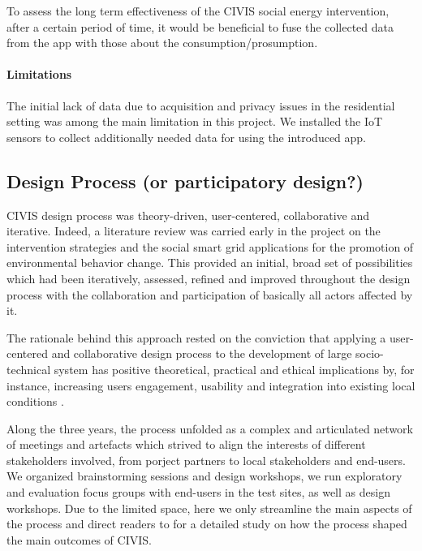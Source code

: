 To assess the long term effectiveness of the CIVIS social energy intervention,  after a certain period of time, it would be beneficial to fuse the collected data from the app with those about the consumption/prosumption. 

\paragraph{Limitations} The initial lack of data due to acquisition and privacy issues in the residential setting was among the main limitation in this project. We installed the IoT sensors to collect additionally needed data for using the introduced app. 

\subsection{Design Process (or participatory design?)}


CIVIS design process was theory-driven, user-centered, collaborative and iterative. Indeed, a
literature review was carried early in the project on the intervention strategies and the social smart
grid applications for the promotion of environmental behavior change. This provided an initial, broad set
of possibilities which had been iteratively, assessed, refined and improved throughout the design process with
the collaboration and participation of basically all actors affected by it.

The rationale behind this approach rested on the conviction that applying a user-centered and
collaborative design process to the development of large socio-technical system has positive
theoretical, practical and ethical implications \cite{Greenbaum1993,Boedker2004} by, for instance, increasing users engagement,
usability and integration into existing local conditions \cite{Brynjarsdottir2012,Dick2012,Pierce2012}.

Along the three years, the process unfolded as a complex and articulated network of meetings and artefacts
which strived to align the interests of different stakeholders involved, from porject partners to
local stakeholders and end-users. We organized brainstorming sessions and design workshops, we run
exploratory and evaluation focus groups with end-users in the test sites, as well as design workshops.
Due to the limited space, here we only streamline the main aspects of the process and direct readers to
\cite{poderi_disentangling_2017} for a detailed study on how the process shaped the main
outcomes of CIVIS. %

